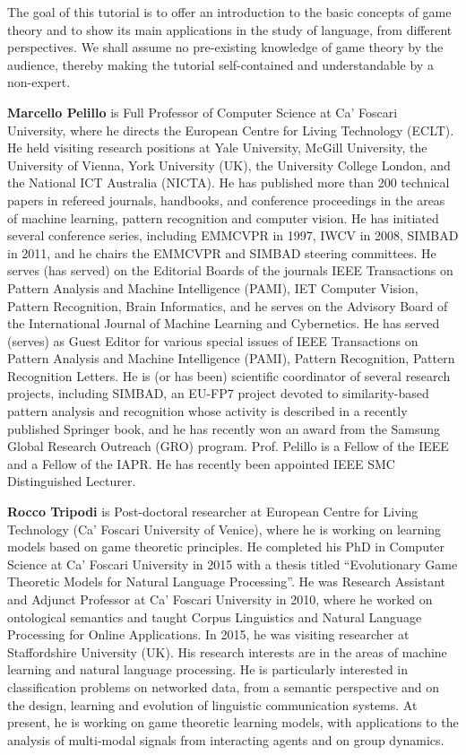 \begin{tutorial}
The goal of this tutorial is to offer an introduction to the basic concepts of game theory and to show its main applications in the study of language, from different perspectives. We shall assume no pre-existing knowledge of game theory by the audience, thereby making the tutorial self-contained and understandable by a non-expert. 

\end{tutorial} 

\begin{bio}
  {\bfseries Marcello Pelillo} is Full Professor of Computer Science at Ca' Foscari University, where he directs the European Centre for Living Technology (ECLT). He held visiting research positions at Yale University, McGill University, the University of Vienna, York University (UK), the University College London, and the National ICT Australia (NICTA). He has published more than 200 technical papers in refereed journals, handbooks, and conference proceedings in the areas of machine learning, pattern recognition and computer vision. He has initiated several conference series, including EMMCVPR in 1997, IWCV in 2008, SIMBAD in 2011, and he chairs the EMMCVPR and SIMBAD steering committees. He serves (has served) on the Editorial Boards of the journals IEEE Transactions on Pattern Analysis and Machine Intelligence (PAMI), IET Computer Vision, Pattern Recognition, Brain Informatics, and he serves on the Advisory Board of the International Journal of Machine Learning and Cybernetics. He has served (serves) as Guest Editor for various special issues of IEEE Transactions on Pattern Analysis and Machine Intelligence (PAMI), Pattern Recognition, Pattern Recognition Letters. He is (or has been) scientific coordinator of several research projects, including SIMBAD, an EU-FP7 project devoted to similarity-based pattern analysis and recognition whose activity is described in a recently published Springer book, and he has recently won an award from the Samsung Global Research Outreach (GRO) program. Prof. Pelillo is a Fellow of the IEEE and a Fellow of the IAPR. He has recently been appointed IEEE SMC Distinguished Lecturer.

  {\bfseries Rocco Tripodi} is Post-doctoral researcher at European Centre for Living Technology (Ca' Foscari University of Venice), where he is working on learning models based on game theoretic principles. He completed his PhD in Computer Science at Ca' Foscari University in 2015 with a thesis titled ``Evolutionary Game Theoretic Models for Natural Language Processing''. He was Research Assistant and Adjunct Professor at Ca' Foscari University in 2010, where he worked on ontological semantics and taught Corpus Linguistics and Natural Language Processing for Online Applications. In 2015, he was visiting researcher at Staffordshire University (UK). His research interests are in the areas of machine learning and natural language processing. He is particularly interested in classification problems on networked data, from a semantic perspective and on the design, learning and evolution of linguistic communication systems. At present, he is working on game theoretic learning models, with applications to the analysis of multi-modal signals from interacting agents and on group dynamics.

\end{bio}
